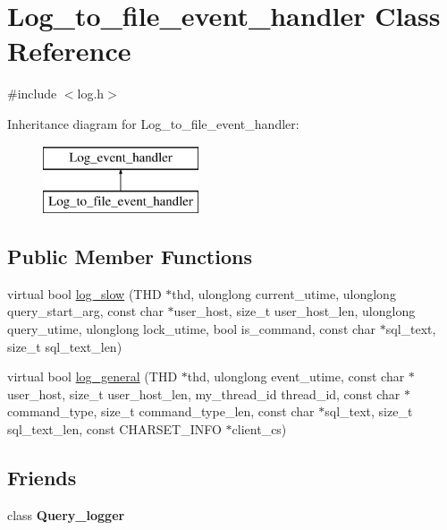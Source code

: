 \hypertarget{classLog__to__file__event__handler}{}\section{Log\+\_\+to\+\_\+file\+\_\+event\+\_\+handler Class Reference}
\label{classLog__to__file__event__handler}


{\ttfamily \#include $<$log.\+h$>$}

Inheritance diagram for Log\+\_\+to\+\_\+file\+\_\+event\+\_\+handler\+:\begin{figure}[H]
\begin{center}
\leavevmode
\includegraphics[height=2.000000cm]{classLog__to__file__event__handler}
\end{center}
\end{figure}
\subsection*{Public Member Functions}
\begin{DoxyCompactItemize}
\item 
virtual bool \mbox{\hyperlink{classLog__to__file__event__handler_ab0454bdadd9f2a600a928c3fa5fd4551}{log\+\_\+slow}} (T\+HD $\ast$thd, ulonglong current\+\_\+utime, ulonglong query\+\_\+start\+\_\+arg, const char $\ast$user\+\_\+host, size\+\_\+t user\+\_\+host\+\_\+len, ulonglong query\+\_\+utime, ulonglong lock\+\_\+utime, bool is\+\_\+command, const char $\ast$sql\+\_\+text, size\+\_\+t sql\+\_\+text\+\_\+len)
\item 
virtual bool \mbox{\hyperlink{classLog__to__file__event__handler_a87190427f382788704a86748f3d3d567}{log\+\_\+general}} (T\+HD $\ast$thd, ulonglong event\+\_\+utime, const char $\ast$user\+\_\+host, size\+\_\+t user\+\_\+host\+\_\+len, my\+\_\+thread\+\_\+id thread\+\_\+id, const char $\ast$command\+\_\+type, size\+\_\+t command\+\_\+type\+\_\+len, const char $\ast$sql\+\_\+text, size\+\_\+t sql\+\_\+text\+\_\+len, const C\+H\+A\+R\+S\+E\+T\+\_\+\+I\+N\+FO $\ast$client\+\_\+cs)
\end{DoxyCompactItemize}
\subsection*{Friends}
\begin{DoxyCompactItemize}
\item 
\mbox{\label{classLog__to__file__event__handler_a29c57bd3a5d5e62664217e3cd1fb457d}} 
class {\bfseries Query\+\_\+logger}
\end{DoxyCompactItemize}


